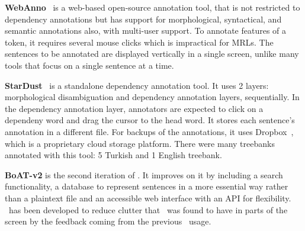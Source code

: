\textbf{WebAnno}~\cite{webanno} is a web-based open-source annotation tool, that is not restricted to dependency annotations but has support for morphological, syntactical, and semantic annotations also, with multi-user support.
To annotate features of a token, it requires several mouse clicks which is impractical for MRLs.
The sentences to be annotated are displayed vertically in a single screen, unlike many tools that focus on a single sentence at a time.

\textbf{StarDust}~\cite{stardust} is a standalone dependency annotation tool.
It uses 2 layers: morphological disambiguation and dependency annotation layers, sequentially.
In the dependency annotation layer, annotators are expected to click on a dependeny word and drag the cursor to the head word.
It stores each sentence's annotation in a different file.
For backups of the annotations, it uses Dropbox~\cite{dropbox}, which is a proprietary cloud storage platform.
There were many treebanks annotated with this tool: 5 Turkish and 1 English treebank.

\textbf{BoAT-v2} is the second iteration of \boatvone.
It improves on it by including a search functionality, a database to represent sentences in a more essential way rather than a plaintext file and an accessible web interface with an API for flexibility.
\boatvtwo\ has been developed to reduce clutter that \boatvone\ was found to have in parts of the screen by the feedback coming from the previous \boatvone\ usage.

